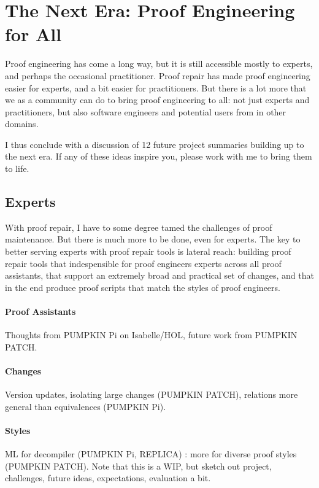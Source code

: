 \section*{The Next Era: Proof Engineering for All}


Proof engineering has come a long way, but it is still accessible mostly to experts, and perhaps the occasional practitioner.
Proof repair has made proof engineering easier for experts, and a bit easier for practitioners.
But there is a lot more that we as a community can do to bring proof engineering to all: not just experts and practitioners,
but also software engineers and potential users from in other domains.

I thus conclude with a discussion of 12 future project summaries building up to the next era.
If any of these ideas inspire you, please work with me to bring them to life.

\subsection*{Experts}

With proof repair, I have to some degree tamed the challenges of proof maintenance.
But there is much more to be done, even for experts.
The key to better serving experts with proof repair tools is lateral reach:
building proof repair tools that indespensible for proof engineers experts
across all proof assistants, that support an extremely broad and practical set of changes,
and that in the end produce proof scripts that match the styles of proof engineers.

\paragraph{Proof Assistants} Thoughts from PUMPKIN Pi on Isabelle/HOL, future work from PUMPKIN PATCH.

\paragraph{Changes} Version updates, isolating large changes (PUMPKIN PATCH), relations more general than equivalences (PUMPKIN Pi).

\paragraph{Styles} ML for decompiler (PUMPKIN Pi, REPLICA) : more for diverse proof styles (PUMPKIN PATCH). Note that this is a WIP, but sketch out project, challenges, future ideas, expectations, evaluation a bit.


